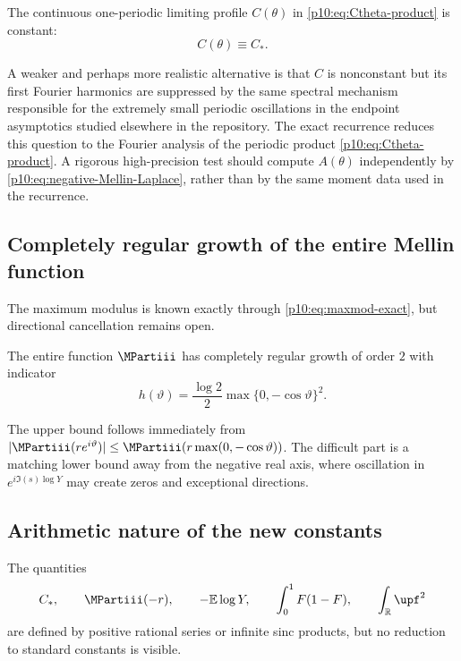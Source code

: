 \documentclass[11pt,oneside]{article}
\theoremstyle{definition}
\theoremstyle{remark}
\newcommand{\F}{F}
\newcommand{\E}{\mathbb E}
\newcommand{\R}{\mathbb R}
\newcommand{\1}{\mathbf 1}
\begin{document}
\begin{conjecture}\label{p10:conj:phase-constant}
The continuous one-periodic limiting profile \(C(\theta)\) in
\cref{p10:eq:Ctheta-product} is constant:
\begin{equation}\label{p10:eq:Ctheta-conjecture}
 C(\theta)\equiv C_*.
\end{equation}
\end{conjecture}

A weaker and perhaps more realistic alternative is that \(C\) is nonconstant but its
first Fourier harmonics are suppressed by the same spectral mechanism responsible for
the extremely small periodic oscillations in the endpoint asymptotics studied elsewhere
in the repository.  The exact recurrence reduces this question to the Fourier analysis
of the periodic product \cref{p10:eq:Ctheta-product}.  A rigorous high-precision
test should compute \(A(\theta)\) independently by \cref{p10:eq:negative-Mellin-Laplace},
rather than by the same moment data used in the recurrence.

\subsection{Completely regular growth of the entire Mellin function}

The maximum modulus is known exactly through \cref{p10:eq:maxmod-exact}, but directional
cancellation remains open.

\begin{conjecture}\label{p10:conj:indicator}
The entire function \(\MPartiii\) has completely regular growth of order \(2\) with indicator
\begin{equation}\label{p10:eq:indicator-conjecture}
 h(\vartheta)=\frac{\log2}{2}
 \max\{0,-\cos\vartheta\}^2.
\end{equation}
\end{conjecture}

The upper bound follows immediately from
\(|\MPartiii(re^{i\vartheta})|\le\MPartiii(r\max(0,-\cos\vartheta))\).  The difficult part is a
matching lower bound away from the negative real axis, where oscillation in
\(e^{i\Im(s)\log Y}\) may create zeros and exceptional directions.

\subsection{Arithmetic nature of the new constants}

The quantities
\begin{equation}\label{p10:eq:new-constants}
 C_*,\qquad \MPartiii(-r),\qquad -\E\log Y,
 \qquad \int_0^1\F(1-\F),\qquad \int_\R\upf^2
\end{equation}
are defined by positive rational series or infinite sinc products, but no reduction to
standard constants is visible.
\end{document}
